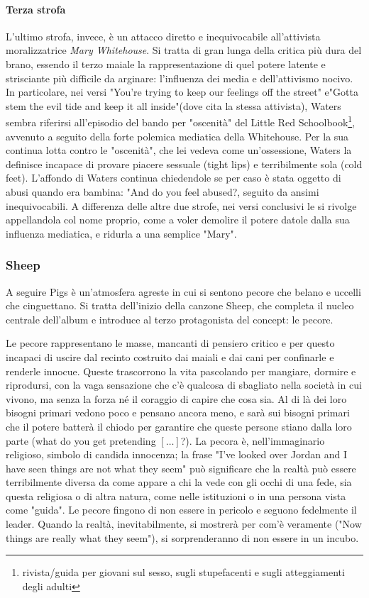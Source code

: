 \documentclass[class=book, crop=false, oneside, 12pt]{standalone}
\begin{document}
    \paragraph{Terza strofa} L'ultimo strofa, invece, è un attacco diretto e inequivocabile all'attivista moralizzatrice \emph{Mary Whitehouse}. Si tratta di gran lunga della critica più dura del brano, essendo il terzo maiale la rappresentazione di quel potere latente e strisciante più difficile da arginare: l'influenza dei media e dell'attivismo nocivo. In particolare, nei versi "You're trying to keep our feelings off the street" e"Gotta stem the evil tide and keep it all inside"(dove cita la stessa attivista), Waters sembra riferirsi all'episodio del bando per "oscenità" del Little Red Schoolbook\footnote{rivista/guida per giovani sul sesso, sugli stupefacenti e sugli atteggiamenti degli adulti}, avvenuto a seguito della forte polemica mediatica della Whitehouse. Per la sua continua lotta contro le "oscenità", che lei vedeva come un'ossessione, Waters la definisce incapace di provare piacere sessuale (tight lips) e terribilmente sola (cold feet). L'affondo di Waters continua chiedendole se per caso è stata oggetto di abusi quando era bambina: "And do you feel abused?, seguito da ansimi inequivocabili. A differenza delle altre due strofe, nei versi conclusivi le si rivolge appellandola col nome proprio, come a voler demolire il potere datole dalla sua influenza mediatica, e ridurla a una semplice "Mary".

    \subsubsection{Sheep}
    A seguire Pigs è un'atmosfera agreste in cui si sentono pecore che belano e uccelli che cinguettano. Si tratta dell'inizio della canzone Sheep, che completa il nucleo centrale dell'album e introduce al terzo protagonista del concept: le pecore.

    Le pecore rappresentano le masse, mancanti di pensiero critico e per questo incapaci di uscire dal recinto costruito dai maiali e dai cani per confinarle e renderle innocue. Queste trascorrono la vita pascolando per mangiare, dormire e riprodursi, con la vaga sensazione che c'è qualcosa di sbagliato nella società in cui vivono, ma senza la forza né il coraggio di capire che cosa sia. Al di là dei loro bisogni primari vedono poco e pensano ancora meno, e sarà sui bisogni primari che il potere batterà il chiodo per garantire che queste persone stiano dalla loro parte (what do you get pretending \([\ldots]\)?). La pecora è, nell'immaginario religioso, simbolo di candida innocenza; la frase "I've looked over Jordan and I have seen things are not what they seem" può significare che la realtà può essere terribilmente diversa da come appare a chi la vede con gli occhi di una fede, sia questa religiosa o di altra natura, come nelle istituzioni o in una persona vista come "guida". Le pecore fingono di non essere in pericolo e seguono fedelmente il leader. Quando la realtà, inevitabilmente, si mostrerà per com'è veramente ("Now things are really what they seem"), si sorprenderanno di non essere in un incubo.
\end{document}
